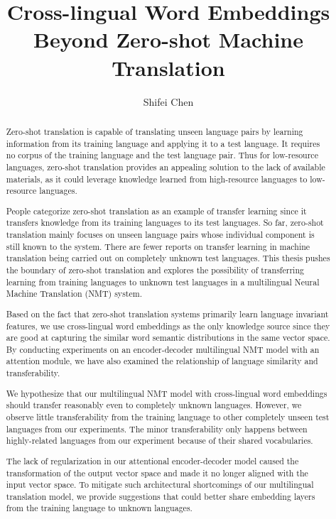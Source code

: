 \documentclass[thesis,fonts=libertine]{cluu}
\begin{document}
\author{Shifei Chen}
\title{Cross-lingual Word Embeddings Beyond Zero-shot Machine Translation}

\maketitle

\begin{abstract}
  Zero-shot translation is capable of translating unseen language pairs by learning information from its training language and applying it to a test language. It requires no corpus of the training language and the test language pair. Thus for low-resource languages, zero-shot translation provides an appealing solution to the lack of available materials, as it could leverage knowledge learned from high-resource languages to low-resource languages.

  People categorize zero-shot translation as an example of transfer learning since it transfers knowledge from its training languages to its test languages. So far, zero-shot translation mainly focuses on unseen language pairs whose individual component is still known to the system. There are fewer reports on transfer learning in machine translation being carried out on completely unknown test languages. This thesis pushes the boundary of zero-shot translation and explores the possibility of transferring learning from training languages to unknown test languages in a multilingual Neural Machine Translation (NMT) system.
 
  Based on the fact that zero-shot translation systems primarily learn language invariant features, we use cross-lingual word embeddings as the only knowledge source since they are good at capturing the similar word semantic distributions in the same vector space. By conducting experiments on an encoder-decoder multilingual NMT model with an attention module, we have also examined the relationship of language similarity and transferability.
 
  We hypothesize that our multilingual NMT model with cross-lingual word embeddings should transfer reasonably even to completely unknown languages. However, we observe little transferability from the training language to other completely unseen test languages from our experiments. The minor transferability only happens between highly-related languages from our experiment because of their shared vocabularies.
 
  The lack of regularization in our attentional encoder-decoder model caused the transformation of the output vector space and made it no longer aligned with the input vector space. To mitigate such architectural shortcomings of our multilingual translation model, we provide suggestions that could better share embedding layers from the training language to unknown languages.
\end{abstract}
\end{document}
